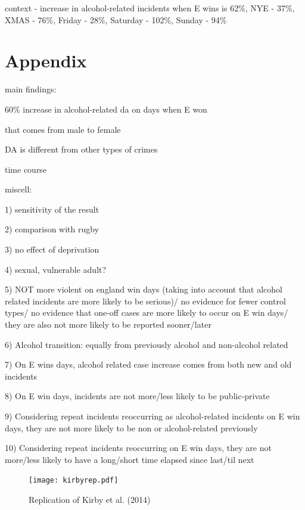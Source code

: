 \documentclass[12pt, letterpaper]{article}
\begin{document}
context - increase in alcohol-related incidents when E wins is 62\%, NYE - 37\%, XMAS - 76\%, Friday - 28\%, Saturday - 102\%, Sunday - 94\%


\section{Appendix}

main findings:

60\% increase in alcohol-related da on days when E won

that comes from male to female

DA is different from other types of crimes

time course

miscell:

1) sensitivity of the result

2) comparison with rugby 

3) no effect of deprivation

4) sexual, vulnerable adult?

5) NOT more violent on england win days (taking into account that alcohol related incidents are more likely to be serious)/ no evidence for fewer control types/ no evidence that one-off cases are more likely to occur on E win days/ they are also not more likely to be reported sooner/later

6) Alcohol transition: equally from previously alcohol and non-alcohol related

7) On E wins days, alcohol related case increase comes from both new and old incidents

8) On E win days, incidents are not more/less likely to be public-private

9) Considering repeat incidents reoccurring as alcohol-related incidents on E win days, they are not more likely to be non or alcohol-related previously

10) Considering repeat incidents reoccurring on E win days, they are not more/less likely to have a long/short time elapsed since last/til next


\begin{figure}[htb!]
\centering
\caption{Replication of Kirby et al. (2014)}
\texttt{[image: kirbyrep.pdf]}
\label{fig:kirbyrep}
\end{figure}

\newpage

%

\printbibliography
\end{document}
